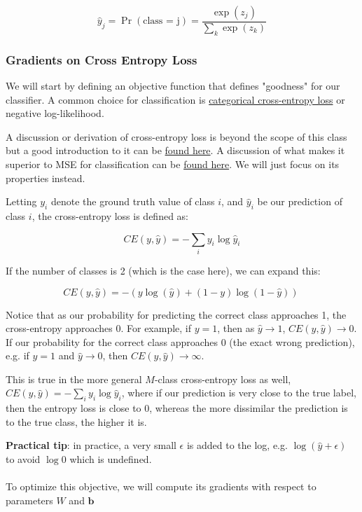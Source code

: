 $$
    \hat{y}_j = \Pr(\text{class = j}) = \frac{\exp(z_j)}{\sum_k \exp(z_k)}
$$


\subsubsection{Gradients on Cross Entropy Loss}
We will start by defining an objective function that defines "goodness" for our classifier.
A common choice for classification is \href{https://en.wikipedia.org/wiki/Cross_entropy}{categorical cross-entropy loss} or negative log-likelihood.

A discussion or derivation of cross-entropy loss is beyond the scope of this class but a good introduction to it can be \href{https://rdipietro.github.io/friendly-intro-to-cross-entropy-loss/}{found here}. A discussion of what makes it superior to MSE for classification can be \href{https://jamesmccaffrey.wordpress.com/2013/11/05/why-you-should-use-cross-entropy-error-instead-of-classification-error-or-mean-squared-error-for-neural-network-classifier-training/}{found here}. We will just focus on its properties instead.

Letting $y_i$ denote the ground truth value of class $i$, and $\hat{y}_i$ be our prediction of class $i$, the cross-entropy loss is defined as:

$$ CE(y, \hat{y}) = -\sum_{i} y_i \log \hat{y}_i $$

If the number of classes is 2 (which is the case here), we can expand this:

$$ CE(y, \hat{y}) = -{(y\log(\hat{y}) + (1 - y)\log(1 - \hat{y}))}\ $$

Notice that as our probability for predicting the correct class approaches 1, the cross-entropy approaches 0. For example, if $y=1$, then as $\hat{y}\rightarrow 1$, $CE(y, \hat{y}) \rightarrow 0$. If our probability for the correct class approaches 0 (the exact wrong prediction), e.g. if $y=1$ and $\hat{y} \rightarrow 0$, then $CE(y, \hat{y}) \rightarrow \infty$.

This is true in the more general $M$-class cross-entropy loss as well, $CE(y, \hat{y}) = -\sum_{i} y_i \log \hat{y}_i $, where if our prediction is very close to the true label, then the entropy loss is close to 0, whereas the more dissimilar the prediction is to the true class, the higher it is.

\noindent\textbf{Practical tip}: in practice, a very small $\epsilon$ is added to the log, e.g. $\log(\hat{y}+\epsilon)$ to avoid $\log 0$ which is undefined.
\\\\
To optimize this objective, we will compute its gradients with respect to parameters $W$ and $\mathbf{b}$


